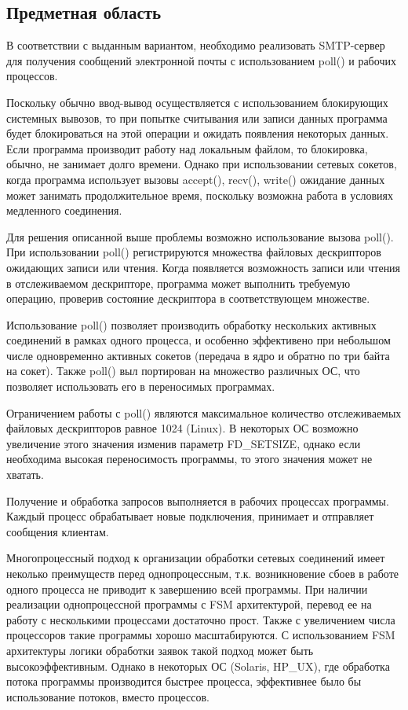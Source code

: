 \documentclass[a4paper,12pt]{report}
\begin{document}
\subsection{Предметная область}
В соответствии с выданным вариантом, необходимо реализовать SMTP-сервер для получения сообщений электронной почты с использованием poll() и рабочих процессов.

Поскольку обычно ввод-вывод осуществляется с использованием блокирующих системных вывозов, то при попытке считывания или записи данных программа будет блокироваться на этой операции и ожидать появления некоторых данных. Если программа производит работу над локальным файлом, то блокировка, обычно, не занимает долго времени. Однако при использовании сетевых сокетов, когда программа использует вызовы accept(), recv(), write() ожидание данных может занимать продолжительное время, поскольку возможна работа в условиях медленного соединения.

Для решения описанной выше проблемы возможно использование вызова poll(). При использовании poll() регистрируются множества файловых дескрипторов ожидающих записи или чтения. Когда появляется возможность записи или чтения в отслеживаемом дескрипторе, программа может выполнить требуемую операцию, проверив состояние дескриптора в соответствующем множестве.

Использование poll() позволяет производить обработку нескольких активных соединений в рамках одного процесса, и особенно эффективено при небольшом числе одновременно активных сокетов (передача в ядро и обратно по три байта на сокет). Также poll() выл портирован на множество различных ОС, что позволяет использовать его в переносимых программах. 

Ограничением работы с poll() являются максимальное количество отслеживаемых файловых дескрипторов равное 1024 (Linux). В некоторых ОС возможно увеличение этого значения изменив параметр FD\_SETSIZE, однако если необходима высокая переносимость программы, то этого значения может не хватать.

Получение и обработка запросов выполняется в рабочих процессах программы. Каждый процесс обрабатывает новые подключения, принимает и отправляет сообщения клиентам.

Многопроцессный подход к организации обработки сетевых соединений имеет неколько преимуществ перед однопроцессным, т.к. возникновение сбоев в работе одного процесса не приводит к завершению всей программы. При наличии реализации однопроцессной программы с FSM архитектурой, перевод ее на работу с несколькими процессами достаточно прост. Также с увеличением числа процессоров такие программы хорошо масштабируются. С использованием FSM архитектуры логики обработки заявок такой подход может быть высокоэффективным. Однако в некоторых ОС (Solaris, HP\_UX), где обработка потока программы производится быстрее процесса, эффективнее было бы использование потоков, вместо процессов. 
\end{document}
